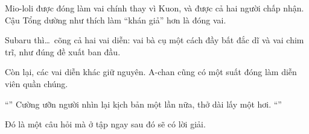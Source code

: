\documentclass[../main.tex]{subfiles}
\begin{document}
Mio-loli được đóng làm vai chính thay vì Kuon, và được cả hai người chấp nhận. Cậu Tổng dường như thích làm ``khán giả'' hơn là đóng vai.

Subaru thì\dots\ cõng cả hai vai diễn: vai bà cụ một cách đầy bất đắc dĩ và vai chim trĩ, như đúng đề xuất ban đầu.

Còn lại, các vai diễn khác giữ nguyên. A-chan cũng có một suất đóng làm diễn viên quần chúng.

``'' Cường ưỡn người nhìn lại kịch bản một lần nữa, thở dài lấy một hơi. ``''

Đó là một câu hỏi mà ở tập ngay sau đó sẽ có lời giải.
\end{document}
